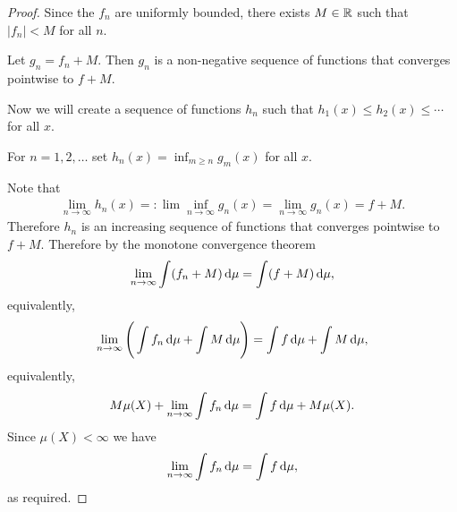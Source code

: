 \begin{proof}
  Since the $f_n$ are uniformly bounded, there exists $M \in \mathbb{R}$ such that $|f_n| < M$ for all $n$.

  Let $g_n = f_n + M$. Then $g_n$ is a non-negative sequence of functions that converges
  pointwise to $f + M$.

  Now we will create a sequence of functions $h_n$ such that $h_1(x) \leq h_2(x) \leq \cdots$ for all $x$.

  For $n=1, 2, \ldots$ set $h_n(x) = \inf_{m \geq n} g_m(x)$ for all $x$.

  Note that
  \begin{align*}
    \lim_{n \to \infty} h_n(x) =: \lim \inf_{n \to \infty} g_n(x) = \lim_{n \to \infty} g_n(x) = f + M.
  \end{align*}
  Therefore $h_n$ is an increasing sequence of functions that converges pointwise to $f + M$. Therefore by the
  monotone convergence theorem
  \begin{align*}
    \lim_{n\to\infty} \int (f_n + M) \d\mu = \int (f + M) \d\mu,
  \end{align*}
  equivalently,
  \begin{align*}
    \lim_{n\to\infty} \Bigg(\int f_n \d\mu + \int M \d\mu \Bigg) = \int f \d\mu + \int M \d\mu,
  \end{align*}
  equivalently,
  \begin{align*}
    M \mu(X) + \lim_{n\to\infty} \int f_n \d\mu = \int f \d\mu + M \mu(X).
  \end{align*}
  Since $\mu(X) < \infty$ we have
  \begin{align*}
    \lim_{n\to\infty} \int f_n \d\mu = \int f \d\mu,
  \end{align*}
  as required.
\end{proof}
